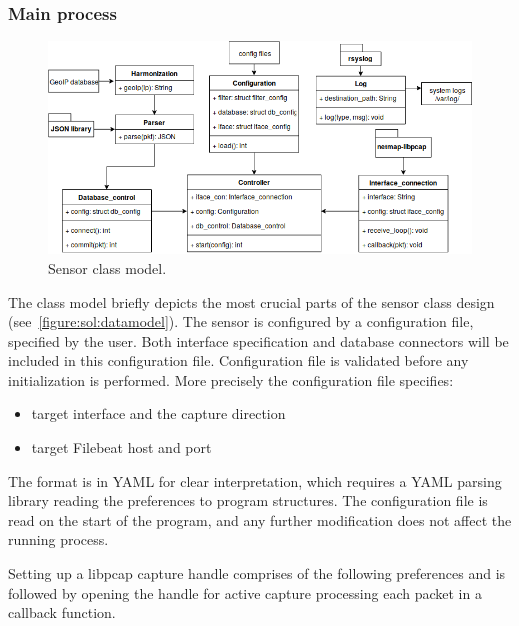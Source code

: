 \documentclass[12pt,a4paper,twoside]{book}
\begin{document}
            \subsubsection*{Main process} \label{solution:design:process}
                \begin{figure}[h]
                    \centering
                    \includegraphics[scale=0.57]{datamodel}
                    \caption{Sensor class model.}
                    \label{figure:sol:datamodel}
                \end{figure}
                The class model briefly depicts the most crucial parts of the sensor class design (see~\autoref{figure:sol:datamodel}). The sensor is configured by a configuration file, specified by the user. Both interface specification and database connectors will be included in this configuration file. Configuration file is validated before any initialization is performed. More precisely the configuration file specifies:
                \begin{itemize}[noitemsep]
                    \item target interface and the capture direction
                    \item target Filebeat host and port
                \end{itemize}\par
                The format is in YAML for clear interpretation, which requires a YAML parsing library reading the preferences to program structures. The configuration file is read on the start of the program, and any further modification does not affect the running process.\par
                Setting up a libpcap capture handle comprises of the following preferences and is followed by opening the handle for active capture processing each packet in a callback function.\par
\end{document}
